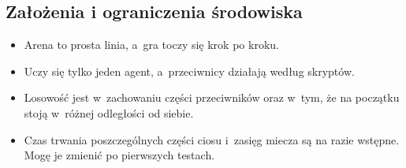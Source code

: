\documentclass[12pt]{article}
\begin{document}
\subsection{Założenia i ograniczenia środowiska}

\begin{itemize}
    \item Arena to prosta linia, a~gra toczy się krok po kroku.
    \item Uczy się tylko jeden agent, a~przeciwnicy działają według skryptów.
    \item Losowość jest w~zachowaniu części przeciwników oraz w~tym, że na początku stoją w~różnej odległości od siebie.
    \item Czas trwania poszczególnych części ciosu i~zasięg miecza są na razie wstępne. Mogę je zmienić po pierwszych testach.
\end{itemize}









\end{document}
